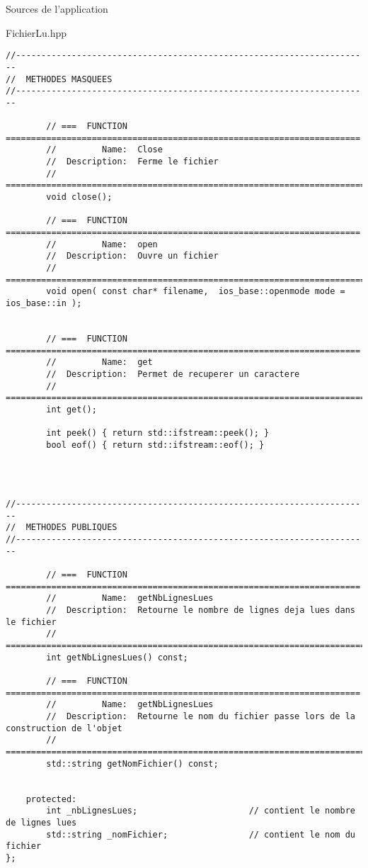 \documentclass{article}
\begin{document}
\begin{section}{Sources de l'application}
\begin{paragraph}{FichierLu.hpp}
\begin{verbatim}
//----------------------------------------------------------------------
//  METHODES MASQUEES
//----------------------------------------------------------------------

        // ===  FUNCTION  ======================================================================
        //         Name:  Close
        //  Description:  Ferme le fichier
        // =====================================================================================
        void close();

        // ===  FUNCTION  ======================================================================
        //         Name:  open
        //  Description:  Ouvre un fichier
        // =====================================================================================
        void open( const char* filename,  ios_base::openmode mode = ios_base::in );


        // ===  FUNCTION  ======================================================================
        //         Name:  get
        //  Description:  Permet de recuperer un caractere 
        // =====================================================================================
        int get();

        int peek() { return std::ifstream::peek(); }
        bool eof() { return std::ifstream::eof(); }




//----------------------------------------------------------------------
//  METHODES PUBLIQUES
//----------------------------------------------------------------------

        // ===  FUNCTION  ======================================================================
        //         Name:  getNbLignesLues
        //  Description:  Retourne le nombre de lignes deja lues dans le fichier
        // =====================================================================================
        int getNbLignesLues() const;

        // ===  FUNCTION  ======================================================================
        //         Name:  getNbLignesLues
        //  Description:  Retourne le nom du fichier passe lors de la construction de l'objet 
        // =====================================================================================
        std::string getNomFichier() const;


    protected:
        int _nbLignesLues;                      // contient le nombre de lignes lues
        std::string _nomFichier;                // contient le nom du fichier
};


\end{verbatim}
\end{paragraph}
\end{section}
\end{document}
